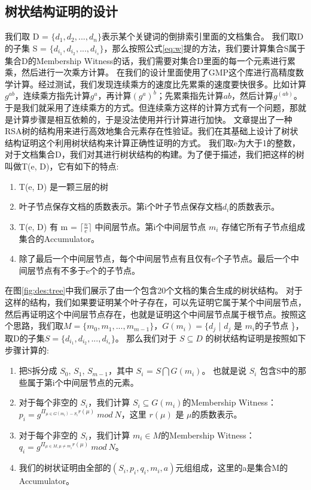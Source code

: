 \subsection{树状结构证明的设计}

我们取 D = $\{d_1, d_2, ..., d_n\}$表示某个关键词的倒排索引里面的文档集合。
我们取D的子集 S = $\{d_{i_1}, d_{i_2}, ..., d_{i_s}\}$，那么按照公式\ref{eq:w}提的方法，我们要计算集合S属于集合D的Membership Witness的话，我们需要对集合D里面的每一个元素进行累乘，然后进行一次乘方计算。
在我们的设计里面使用了GMP这个库进行高精度数学计算。经过测试，我们发现连续乘方的速度比先累乘的速度要快很多。比如计算$g^{ab}$，连续乘方指先计算$g^a$，再计算$(g^a)^b$；先累乘指先计算$ab$，然后计算$g^{(ab)}$。于是我们就采用了连续乘方的方式。但连续乘方这样的计算方式有一个问题，那就是计算步骤是相互依赖的，于是没法使用并行计算进行加快。
文章\cite{papamanthou2008authenticated}提出了一种RSA树的结构用来进行高效地集合元素存在性验证。我们在其基础上设计了树状结构证明这个利用树状结构来计算正确性证明的方式。
我们取e为大于1的整数，对于文档集合D，我们对其进行树状结构的构建。为了便于描述，我们把这样的树叫做T(e, D)，它有如下的特点:
\begin{enumerate}
  \item T(e, D) 是一颗三层的树
  \item 叶子节点保存文档的质数表示。第i个叶子节点保存文档$d_i$的质数表示。
  \item T(e, D) 有 m = $\lceil \frac{n}{e} \rceil$ 中间层节点。第i个中间层节点 $m_i$ 存储它所有子节点组成集合的Accumulator。
  \item 除了最后一个中间层节点，每个中间层节点有且仅有e个子节点。最后一个中间层节点有不多于e个的子节点。
\end{enumerate}

在图\ref{fig:des:tree}中我们展示了由一个包含20个文档的集合生成的树状结构。
对于这样的结构，我们如果要证明某个叶子存在，可以先证明它属于某个中间层节点，然后再证明这个中间层节点存在，也就是证明这个中间层节点属于根节点。按照这个思路，我们取$M = \{m_0, m_1, ..., m_{m-1}\}$，$G(m_i) = \{d_j$ | $d_j$ 是 $m_i$的子节点 \}，取D的子集$S = \{d_{i_1}, d_{i_2}, ..., d_{i_s}\}$。 那么我们对于 $S \subseteq D$ 的树状结构证明是按照如下步骤计算的:
\begin{enumerate}
  \item 把S拆分成 $S_0$, $S_1$, $S_{m-1}$，其中 $S_i$ = $S \bigcap G(m_i)$。 也就是说 $S_i$ 包含S中的那些属于第i个中间层节点的元素。
  \item 对于每个非空的 $S_i$，我们计算 $S_i \subseteq G(m_i)$的Membership Witness：$p_i = g^{\Pi_{\mu \in G(m_i) - S_i} r(\mu)}\ mod\ N$，这里 $r(\mu)$ 是 $\mu$的质数表示。 
  \item 对于每个非空的 $S_i$，我们计算 $m_i \in M$的Membership Witness：$q_i =  g^{\Pi_{\mu \in M, \mu \ne m_i} r(\mu)}\ mod\ N$。
  \item 我们的树状证明由全部的$(S_i, p_i, q_i, m_i, a)$元组组成，这里的a是集合M的Accumulator。
\end{enumerate}

